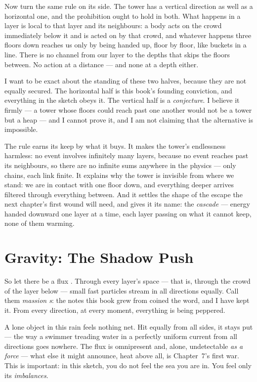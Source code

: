 \documentclass[fontsize=11pt,paper=a4,pagesize=auto,parskip=half-]{scrbook}
\newcommand{\Ixtmp}{}
\DeclareRobustCommand{\Ix}[1]{%
  #1%
  \begingroup
    \lowercase{\gdef\Ixtmp{#1}}%
    \expandafter\index\expandafter{\Ixtmp}%
  \endgroup}
\begin{document}
Now turn the same rule on its side. The tower has a vertical direction as well as a horizontal one, and the prohibition ought to hold in both. What happens in a layer is local to that layer and its neighbours: a body acts on the crowd immediately below it and is acted on by that crowd, and whatever happens three floors down reaches us only by being handed up, floor by floor, like buckets in a line. There is no channel from our layer to the depths that skips the floors between. No action at a distance --- and none at a depth either.

I want to be exact about the standing of these two halves, because they are not equally secured. The horizontal half is this book's founding conviction, and everything in the sketch obeys it. The vertical half is a \emph{conjecture}. I believe it firmly --- a tower whose floors could reach past one another would not be a tower but a heap --- and I cannot prove it, and I am not claiming that the alternative is impossible.

The rule earns its keep by what it buys. It makes the tower's endlessness harmless: no event involves infinitely many layers, because no event reaches past its neighbours, so there are no infinite sums anywhere in the physics --- only chains, each link finite. It explains why the tower is invisible from where we stand: we are in contact with one floor down, and everything deeper arrives filtered through everything between. And it settles the shape of the escape the next chapter's first wound will need, and gives it its name: the \emph{\Ix{cascade}} --- energy handed downward one layer at a time, each layer passing on what it cannot keep, none of them warming.


\section{Gravity: The Shadow Push}

So let there be a \Ix{flux}. Through every layer's space --- that is, through the crowd of the layer below --- small fast particles stream in all directions equally. Call them \emph{\Ix{massion}s}: the notes this book grew from coined the word, and I have kept it. From every direction, at every moment, everything is being peppered.

A lone object in this rain feels nothing net. Hit equally from all sides, it stays put --- the way a swimmer treading water in a perfectly uniform current from all directions goes nowhere. The flux is omnipresent and, alone, undetectable \emph{as a force} --- what else it might announce, heat above all, is Chapter~7's first war. This is important: in this sketch, you do not feel the sea you are in. You feel only its \emph{imbalances}.
\end{document}

